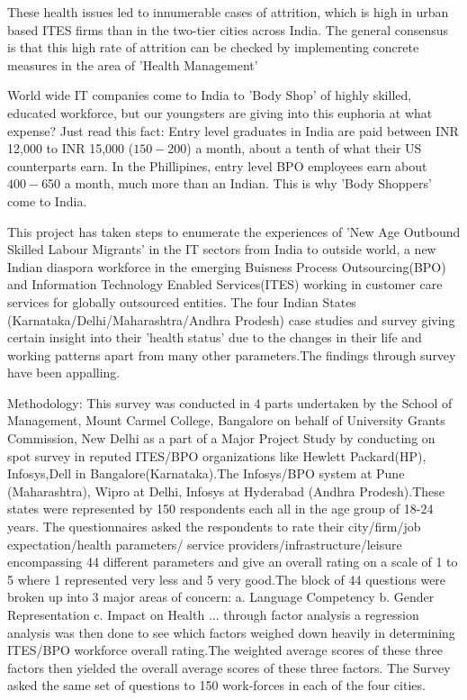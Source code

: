 These health issues led to innumerable cases of attrition, which is high in urban based ITES firms than in the two-tier cities across India. The general consensus is that this high rate of attrition can be checked by implementing concrete measures in the area of 'Health Management'

World wide IT companies come to India to 'Body Shop' of highly skilled, educated workforce, but our youngsters are giving into this euphoria at what expense? Just read this fact: Entry level graduates in India are paid between INR 12,000 to INR 15,000 ($150-$200) a month, about a tenth of what their US counterparts earn. In the Phillipines, entry level BPO employees earn about $400- $650 a month, much more than an Indian. This is why 'Body Shoppers' come to India.



This project has taken steps to enumerate the experiences of 'New Age Outbound Skilled Labour Migrants' in the IT sectors from India to outside world, a new Indian diaspora  workforce in the emerging Buisness Process Outsourcing(BPO) and Information Technology Enabled Services(ITES) working in customer care services for globally outsourced entities. The four Indian States (Karnataka/Delhi/Maharashtra/Andhra Prodesh) case studies and survey giving certain insight into their 'health status' due to the changes in their life and working patterns apart from many other parameters.The findings through survey have been appalling.

Methodology:
This survey was conducted in 4 parts undertaken by the School of Management, Mount Carmel College, Bangalore on behalf of University Grants Commission, New Delhi as a part of a Major  Project Study by conducting on spot survey in reputed ITES/BPO organizations like Hewlett Packard(HP), Infosys,Dell in Bangalore(Karnataka).The Infosys/BPO system at Pune (Maharashtra), Wipro at Delhi, Infosys at Hyderabad (Andhra Prodesh).These states were represented by 150 respondents each all in the age group of 18-24 years. The questionnaires asked the respondents to rate their city/firm/job expectation/health parameters/ service providers/infrastructure/leisure encompassing 44 different parameters and give an overall rating on a scale of 1 to 5 where 1 represented very less and 5 very good.The block of 44 questions were broken up into 3 major areas of concern:
a. Language Competency
b. Gender Representation
c. Impact on Health
... through factor analysis a regression analysis was then done to see which factors weighed down heavily in determining ITES/BPO workforce overall rating.The weighted average scores of these three factors then yielded the overall average scores of these three factors. The Survey asked the same set of questions to 150 work-forces in each of the four cities.

